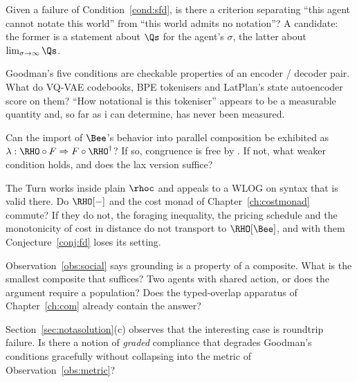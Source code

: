 \begin{question}
\label{q:density}
Given a failure of Condition~\ref{cond:sfd}, is there a criterion
separating ``this agent cannot notate this world'' from ``this
world admits no notation''?
A candidate: the former is a statement about $\Qs$ for the agent's
$\sigma$, the latter about $\lim_{\sigma \to \infty} \Qs$.
\end{question}

\begin{question}
\label{q:codebooks}
Goodman's five conditions are checkable properties of an
encoder / decoder pair.
What do VQ-VAE codebooks, BPE tokenisers and LatPlan's state
autoencoder score on them?
``How notational is this tokeniser'' appears to be a measurable
quantity and, so far as i can determine, has never been measured.
\end{question}

\begin{question}
\label{q:gsos}
Can the import of $\Bee$'s behavior into parallel composition be
exhibited as $\lambda : \RHO \circ F \Rightarrow F \circ
\RHO^{\dagger}$?
If so, congruence is free by \cite{turiplotkin}.
If not, what weaker condition holds, and does the lax version
suffice?
\end{question}

\begin{question}
\label{q:monad}
The Turn works inside plain $\rhoc$ and appeals to a WLOG on syntax
that is valid there.
Do $\RHO[-]$ and the cost monad of Chapter~\ref{ch:costmonad}
commute?
If they do not, the foraging inequality, the pricing schedule and
the monotonicity of cost in distance do not transport to
$\RHO[\Bee]$, and with them Conjecture~\ref{conj:fd} loses its
setting.
\end{question}

\begin{question}
\label{q:social}
Observation~\ref{obs:social} says grounding is a property of a
composite.
What is the smallest composite that suffices?
Two agents with shared action, or does the argument require a
population?
Does the typed-overlap apparatus of Chapter~\ref{ch:com} already
contain the answer?
\end{question}

\begin{question}
\label{q:approx}
Section~\ref{sec:notasolution}(c) observes that the interesting
case is roundtrip failure.
Is there a notion of \emph{graded} compliance that degrades
Goodman's conditions gracefully without collapsing into the metric
of Observation~\ref{obs:metric}?
\end{question}

